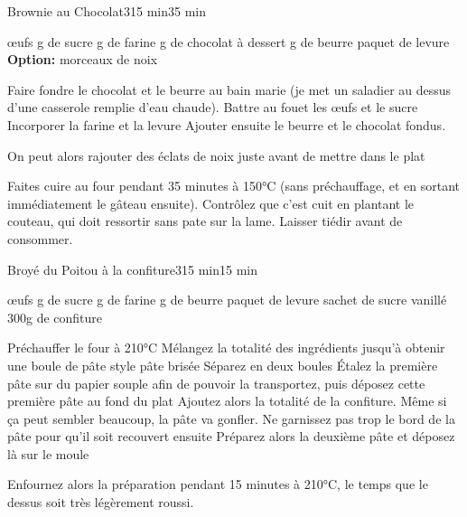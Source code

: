 \begin{recette}{Brownie au Chocolat}{3}{15 min}{35 min}
\begin{ingredients}
 œufs
 g de sucre
 g de farine
 g de chocolat à dessert
 g de beurre
 paquet de levure
\ingredient \textbf{Option: } morceaux de noix
\end{ingredients}

\begin{preparation}
\etape Faire fondre le chocolat et le beurre au bain marie (je met un saladier au dessus d'une casserole remplie d'eau chaude).
\etape Battre au fouet les œufs et le sucre
\etape Incorporer la farine et la levure
\etape Ajouter ensuite le beurre et le chocolat fondus.
\begin{remarque}
On peut alors rajouter des éclats de noix juste avant de mettre dans le plat
\end{remarque}

\end{preparation}

\begin{cuisson}
Faites cuire au four pendant 35 minutes à 150°C (sans préchauffage, et en sortant immédiatement le gâteau ensuite). Contrôlez 
que c'est cuit en plantant le couteau, qui doit ressortir sans pate sur la lame.
Laisser tiédir avant de consommer. 
\end{cuisson}
\end{recette}

\begin{recette}{Broyé du Poitou à la confiture}{3}{15 min}{15 min}
\begin{ingredients}
 œufs
 g de sucre
 g de farine
 g de beurre
 paquet de levure
 sachet de sucre vanillé
\ingredient 300g de confiture
\end{ingredients}

\begin{preparation}
\etape Préchauffer le four à 210°C
\etape Mélangez la totalité des ingrédients jusqu'à obtenir une boule de pâte style pâte brisée
\etape Séparez en deux boules
\etape Étalez la première pâte sur du papier souple afin de pouvoir la transportez, puis déposez cette première pâte au fond du 
plat
\etape Ajoutez alors la totalité de la confiture. Même si ça peut sembler beaucoup, la pâte va gonfler. Ne garnissez pas trop 
le bord de la pâte pour qu'il soit recouvert ensuite
\etape Préparez alors la deuxième pâte et déposez là sur le moule

\end{preparation}

\begin{cuisson}
Enfournez alors la préparation pendant 15 minutes à 210°C, le temps que le dessus soit très légèrement roussi.
\end{cuisson}
\end{recette}

